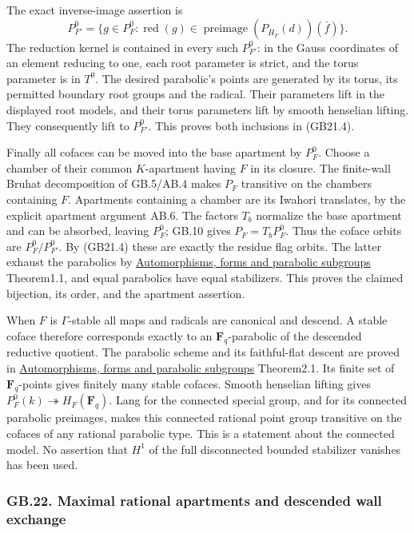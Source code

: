 \documentclass[
  11pt,
]{article}
\begin{document}
The exact inverse-image assertion is \[
 P_{F'}^0=
 \{g\in P_F^0:
          \operatorname{red}(g)\in
        \operatorname{preimage}(P_{\overline H_F}(d))(\bar f)\}.
                                                               \tag{GB21.4}
\] The reduction kernel is contained in every such \(P_{F'}^0\): in the
Gauss coordinates of an element reducing to one, each root parameter is
strict, and the torus parameter is in \(T^0\). The desired parabolic's
points are generated by its torus, its permitted boundary root groups
and the radical. Their parameters lift in the displayed root models, and
their torus parameters lift by smooth henselian lifting. They
consequently lift to \(P_{F'}^0\). This proves both inclusions in
(GB21.4).

Finally all cofaces can be moved into the base apartment by \(P_F^0\).
Choose a chamber of their common \(K\)-apartment having \(F\) in its
closure. The finite-wall Bruhat decomposition of GB.5/AB.4 makes \(P_F\)
transitive on the chambers containing \(F\). Apartments containing a
chamber are its Iwahori translates, by the explicit apartment argument
AB.6. The factors \(T_b\) normalize the base apartment and can be
absorbed, leaving \(P_F^0\); GB.10 gives \(P_F=T_bP_F^0\). Thus the
coface orbits are \(P_F^0/P_{F'}^0\). By (GB21.4) these are exactly the
residue flag orbits. The latter exhaust the parabolics by
\href{../AG-RG/AG-RG-06.html}{Automorphisms, forms and parabolic
subgroups} Theorem1.1, and equal parabolics have equal stabilizers. This
proves the claimed bijection, its order, and the apartment assertion.

When \(F\) is \(\Gamma\)-stable all maps and radicals are canonical and
descend. A stable coface therefore corresponds exactly to an
\(\mathbf F_q\)-parabolic of the descended reductive quotient. The
parabolic scheme and its faithful-flat descent are proved in
\href{../AG-RG/AG-RG-06.html}{Automorphisms, forms and parabolic
subgroups} Theorem2.1. Its finite set of \(\mathbf F_q\)-points gives
finitely many stable cofaces. Smooth henselian lifting gives
\(P_F^0(k)\twoheadrightarrow H_F(\mathbf F_q)\). Lang for the connected
special group, and for its connected parabolic preimages, makes this
connected rational point group transitive on the cofaces of any rational
parabolic type. This is a statement about the connected model. No
assertion that \(H^1\) of the full disconnected bounded stabilizer
vanishes has been used.

\subsubsection{GB.22. Maximal rational apartments and descended wall
exchange}\label{gb.22.-maximal-rational-apartments-and-descended-wall-exchange}
\end{document}
